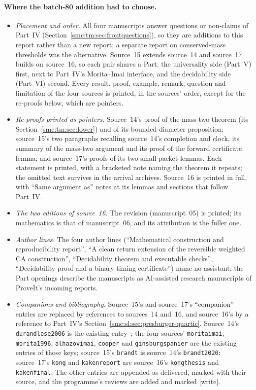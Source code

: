 \documentclass[11pt,letterpaper]{article}
\numberwithin{equation}{section}
\theoremstyle{definition}
\theoremstyle{remark}
\newcommand{\wtag}{\textup{[write]}}
\begin{document}
\paragraph{Where the batch-80 addition had to choose.}
\begin{itemize}
\item \emph{Placement and order.} All four manuscripts answer questions or non-claims of Part~IV (Section~\ref{smc:tm:sec:frontquestions}), so they are additions to this report rather than a new report; a separate report on conserved-mass thresholds was the alternative. Source~15 extends source~14 and source~17 builds on source~16, so each pair shares a Part: the universality side (Part~V) first, next to Part~IV's Morita--Imai interface, and the decidability side (Part~VI) second. Every result, proof, example, remark, question and limitation of the four sources is printed, in the sources' order, except for the re-proofs below, which are pointers.
\item \emph{Re-proofs printed as pointers.} Source~14's proof of the mass-two theorem (its Section~\ref{smc:tm:sec:lower}) and of its bounded-diameter proposition; source~15's two paragraphs recalling source~14's completion and clock, its summary of the mass-two argument and its proof of the forward certificate lemma; and source~17's proofs of its two small-packet lemmas. Each statement is printed, with a bracketed note naming the theorem it repeats; the omitted text survives in the arrival archives. Source~16 is printed in full, with ``Same argument as'' notes at its lemmas and sections that follow Part~IV.
\item \emph{The two editions of source~16.} The revision (manuscript~05) is printed; its mathematics is that of manuscript~06, and its attribution is the fuller one.
\item \emph{Author lines.} The four author lines (``Mathematical construction and reproducibility report'', ``A clean return extension of the reversible weighted CA construction'', ``Decidability theorem and executable checks'', ``Decidability proof and a binary timing certificate'') name no assistant; the Part openings describe the manuscripts as AI-assisted research manuscripts of ProveIt's incoming reports.
\item \emph{Companions and bibliography.} Source~15's and source~17's ``companion'' entries are replaced by references to sources~14 and~16, and source~16's by a reference to Part~IV's Section~\ref{smc:sl:sec:presburger-quartic}. Source~14's \texttt{durandlose2006} is the existing entry~\cite{DL06}; the four sources' \texttt{moritaimai}, \texttt{morita1996}, \texttt{alhazovimai}, \texttt{cooper} and \texttt{ginsburgspanier} are the existing entries of those keys; source~15's \texttt{brandt} is source~14's \texttt{brandt2020}; source~17's \texttt{kong} and \texttt{kakenreport} are source~16's \texttt{kongthesis} and \texttt{kakenfinal}. The other entries are appended as delivered, marked with their source, and the programme's reviews are added and marked \wtag.

\end{itemize}
\end{document}
